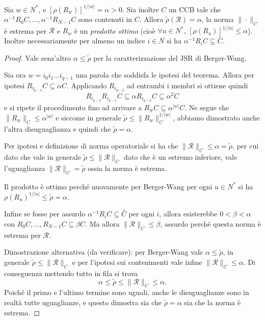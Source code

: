 \begin{lemma}[chiave]
	Sia $w\in N^{*}$, e $[\rho(R_{w})]^{1/|w|} = \alpha >0$. Sia inoltre $C$ un CCB tale che $\alpha^{-1}R_{0}C, \dots, \alpha^{-1}R_{N-1}C$ sono contenuti in $C$. Allora $\tilde\rho(\mathcal R) = \alpha$, la norma $\|\cdot\|_{C}$ è estrema per $\mathcal R$ e $R_{w}$ è un \emph{prodotto ottimo} (cioè $\forall u\in N^{*},\,[\rho(R_{u})]^{1/|u|}\leq\alpha$). Inoltre necessariamente per almeno un indice $i\in N$ si ha $\alpha^{-1}R_{i}C \subsetneq \overset{\circ}{C}$.
\end{lemma}
\begin{proof}
	Vale senz'altro $\alpha\leq\tilde\rho$ per la caratterizzazione del JSR di Berger-Wang. 
	
	Sia ora $w = i_{0}i_{1}\dots i_{q-1}$ una parola che soddisfa le ipotesi del teorema. Allora per ipotesi $R_{i_{q-1}}C\subseteq\alpha C$. Applicando $R_{i_{q-2}}$ ad entrambi i membri si ottiene quindi 
	$$R_{i_{q-2}}R_{i_{q-1}}C\subseteq \alpha R_{i_{q-2}}C\subseteq\alpha^{2}C$$
	e si ripete il procedimento fino ad arrivare a $R_{w}C\subseteq\alpha^{|w|}C$.
	Ne segue che $\|R_{w}\|_{C}\leq\alpha^{|w|}$ e siccome in generale $\tilde\rho\leq\|R_{w}\|_{C}^{1/|w|}$, abbiamo dimostrato anche l'altra disuguaglianza e quindi che $\tilde\rho = \alpha$.
	
	Per ipotesi e definizione di norma operatoriale si ha che $\|\mathcal R\|_{C}\leq \alpha = \tilde\rho$, per cui dato che vale in generale $\tilde\rho\leq\|\mathcal R\|_{C}$ dato che è un estremo inferiore, vale l'uguaglianza $\|\mathcal R\|_{C}= \tilde\rho$ ossia la norma è estrema. 
	
	Il prodotto è ottimo perché nuovamente per Berger-Wang per ogni $u\in N^{*}$ si ha $\rho(R_{u})^{1/|u|} \leq\tilde\rho = \alpha$.
	
	Infine se fosse per assurdo $\alpha^{-1}R_{i}C\subseteq\overset{\circ}{C}$ per ogni $i$, allora esisterebbe $0<\beta<\alpha$ con $R_{0}C,\dots,R_{N-1}C\subseteq\beta C$. Ma allora $\|\mathcal R\|_{C}\leq\beta$, assurdo perché questa norma è estrema per $\mathcal R$.
	
	Dimostrazione alternativa (da verificare): per Berger-Wang vale $\alpha\leq\tilde\rho$, in generale $\tilde\rho\leq\|\mathcal R\|_{C}$ e per l'ipotesi sui contenimenti vale infine $\|\mathcal R\|_{C}\leq\alpha$. Di conseguenza mettendo tutto in fila si trova 
	$$\alpha\leq\tilde\rho\leq\|\mathcal R\|_{C}\leq\alpha.$$
	Poiché il primo e l'ultimo termine sono uguali, anche le disuguaglianze sono in realtà tutte uguaglianze, e questo dimostra sia che $\tilde\rho = \alpha$ sia che la norma è estrema.
\end{proof}

